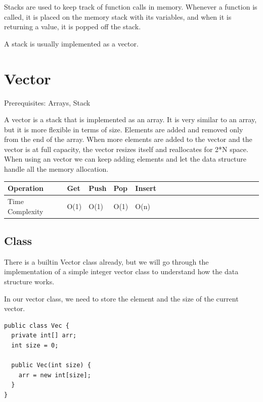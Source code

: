 \documentclass[11pt,oneside]{book}
\begin{document}
Stacks are used to keep track of function calls in memory. Whenever a function is called, it is placed on the memory stack with its variables, and when it is returning a value, it is popped off the stack.

A stack is usually implemented as a vector.


        \section{ Vector }
        

Prerequisites: Arrays, Stack



A vector is a stack that is implemented as an array. It is very similar to an array, but it is more flexible in terms of size. Elements are added and removed only from the end of the array. When more elements are added to the vector and the vector is at full capacity, the vector resizes itself and reallocates for 2*N space. When using an vector we can keep adding elements and let the data structure handle all the memory allocation.

\vspace{10px}\begin{tabulary}{0.4\linewidth}{|l|l|l|l|l|l|l|l|l|l|l|l|l|l|l|l|l|l|l}\hline


  Operation &
  Get &
  Push &
  Pop &
  Insert\\
\hline


  Time Complexity &
  O(1) &
  O(1) &
  O(1) &
  O(n)\\

\hline\end{tabulary}

\subsection{Class}

There is a builtin Vector class already, but we will go through the implementation of a simple integer vector class to understand how the data structure works.

In our vector class, we need to store the element and the size of the current vector.

\begin{lstlisting}
public class Vec {
  private int[] arr;
  int size = 0;

  public Vec(int size) {
    arr = new int[size];
  }
}
\end{lstlisting}
\end{document}
